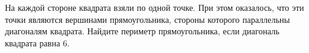 \begin{ex}
	\begin{condition}
		На каждой стороне квадрата взяли по одной точке. При этом оказалось, что эти точки являются вершинами прямоугольника, стороны которого параллельны диагоналям квадрата. Найдите периметр прямоугольника, если диагональ квадрата равна \( 6 \).	\end{condition}
\end{ex}